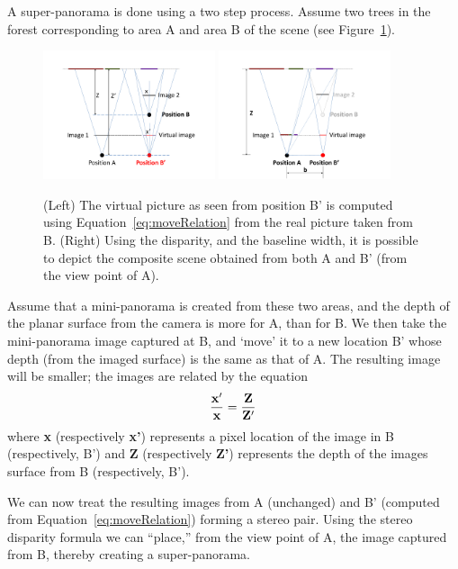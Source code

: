 \documentclass[11pt]{article}
\begin{document}
A super-panorama is done using a two step process. Assume two trees in
the forest corresponding to area A and area B of the scene (see
Figure~\ref{fig:stereo}). 
\begin{figure}[h!]
  \centering
  \includegraphics[width=0.45\textwidth]{mosaicing/figures/move} 
  \includegraphics[width=0.45\textwidth]{mosaicing/figures/stereo} 
  \caption{ \label{fig:stereo} (Left) The virtual picture as seen from position
  B' is computed using Equation~\ref{eq:moveRelation} from the real picture
    taken from B.  (Right) Using the disparity, and the baseline width,
  it is possible to depict the composite scene obtained from both A
  and B' (from the view point of A).}
\end{figure}    
Assume that a mini-panorama is created from these two areas, and the
depth of the planar surface from the camera is more for A, than for
B. We then take the mini-panorama image captured at B, and `move' it to
a new location B’ whose depth (from the imaged surface) is the same as
that of A. The resulting image  will be smaller; the images are
related by the equation
\begin{equation}
  \label{eq:moveRelation}
  {\bf \frac{x'}{x} = \frac{Z}{Z'}}
\end{equation}
where {\bf x} (respectively {\bf x'}) represents a pixel location of
the image in B (respectively, B') and 
{\bf Z} (respectively {\bf Z'}) represents the depth of the images
surface from B (respectively, B').

We can now treat the resulting images from A (unchanged) and B’
(computed from Equation~\ref{eq:moveRelation}) forming a stereo pair.
Using the stereo disparity formula we can ``place,'' from the view
point of A, the image captured from B, thereby creating a
super-panorama.
\end{document}
